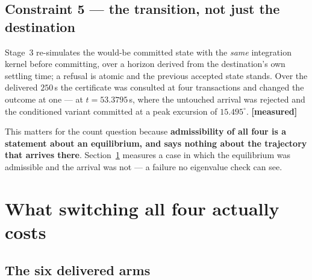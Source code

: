 \documentclass[12pt,a4paper]{article}
\theoremstyle{remark}
\newcommand{\measured}{\textcolor{ok}{\textbf{[measured]}}}
\begin{document}
\subsection{Constraint 5 --- the transition, not just the destination}

Stage~3 re-simulates the would-be committed state with the \emph{same}
integration kernel before committing, over a horizon derived from the
destination's own settling time; a refusal is atomic and the previous accepted
state stands. Over the delivered $250$\,s the certificate was consulted at four
transactions and changed the outcome at one --- at $t=53.3795$\,s, where the
untouched arrival was rejected and the conditioned variant committed at a peak
excursion of $15.495^{\circ}$. \measured

This matters for the count question because \textbf{admissibility of all four is
a statement about an equilibrium, and says nothing about the trajectory that
arrives there}. Section~\ref{sec:cost} measures a case in which the equilibrium
was admissible and the arrival was not --- a failure no eigenvalue check can see.

\section{What switching all four actually costs}\label{sec:cost}

\subsection{The six delivered arms}
\end{document}
